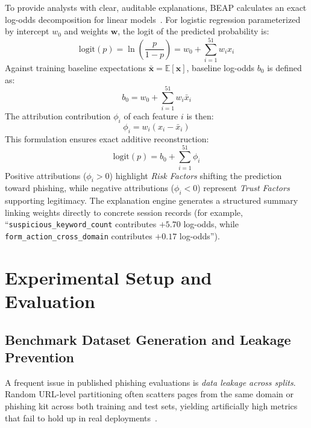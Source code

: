 \documentclass[conference]{IEEEtran}
\begin{document}
To provide analysts with clear, auditable explanations, BEAP calculates an exact log-odds decomposition for linear models~\cite{calzarossa2025}. For logistic regression parameterized by intercept $w_0$ and weights $\mathbf{w}$, the logit of the predicted probability is:
\begin{equation}
\text{logit}(p) = \ln\left(\frac{p}{1-p}\right) = w_0 + \sum_{i=1}^{51} w_i x_i
\end{equation}
Against training baseline expectations $\bar{\mathbf{x}} = \mathbb{E}[\mathbf{x}]$, baseline log-odds $b_0$ is defined as:
\begin{equation}
b_0 = w_0 + \sum_{i=1}^{51} w_i \bar{x}_i
\end{equation}
The attribution contribution $\phi_i$ of each feature $i$ is then:
\begin{equation}
\phi_i = w_i (x_i - \bar{x}_i)
\end{equation}
This formulation ensures exact additive reconstruction:
\begin{equation}
\text{logit}(p) = b_0 + \sum_{i=1}^{51} \phi_i
\end{equation}
Positive attributions ($\phi_i > 0$) highlight \textit{Risk Factors} shifting the prediction toward phishing, while negative attributions ($\phi_i < 0$) represent \textit{Trust Factors} supporting legitimacy. The explanation engine generates a structured summary linking weights directly to concrete session records (for example, ``\texttt{suspicious\_keyword\_count} contributes $+5.70$ log-odds, while \texttt{form\_action\_cross\_domain} contributes $+0.17$ log-odds'').

\section{Experimental Setup and Evaluation}\label{experimental-setup}

\subsection{Benchmark Dataset Generation and Leakage Prevention}\label{benchmark-setup}

A frequent issue in published phishing evaluations is \textit{data leakage across splits}. Random URL-level partitioning often scatters pages from the same domain or phishing kit across both training and test sets, yielding artificially high metrics that fail to hold up in real deployments~\cite{sanchez2022,castano2023}.
\end{document}
